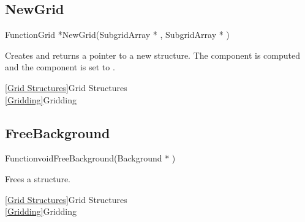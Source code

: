
\newpage
\subsection{NewGrid}
\label{NewGrid}


\begin{deftypefn}{Function}{Grid *}{NewGrid}({SubgridArray *} , {SubgridArray *} )

\DESCRIPTION
Creates and returns a pointer to a new  structure.
The  component is computed and the 
component is set to .

\SEEALSO
\vref{Grid Structures}{Grid Structures}\\
\vref{Gridding}{Gridding}

\end{deftypefn}


\newpage
\subsection{FreeBackground}
\label{FreeBackground}


\begin{deftypefn}{Function}{void}{FreeBackground}({Background *} )

\DESCRIPTION
Frees a  structure.

\SEEALSO
\vref{Grid Structures}{Grid Structures}\\
\vref{Gridding}{Gridding}

\end{deftypefn}


